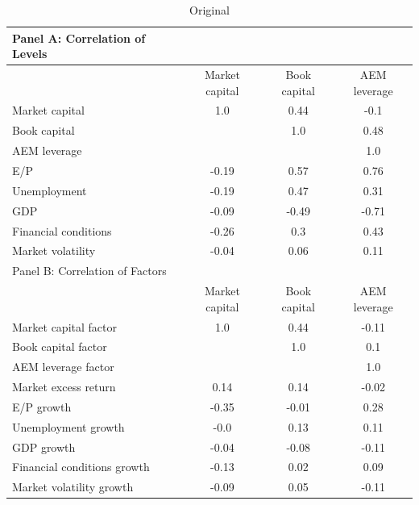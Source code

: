 \documentclass{article}
\begin{document}
    \begin{table}[htbp]
    \centering
    \caption{\label{tab:correlation}Original}
    \begin{adjustbox}{max width=\textwidth}
    \small
    \begin{tabular}{lccc}
        \toprule
        Panel A: Correlation of Levels \\
        \midrule
         & Market capital & Book capital & AEM leverage \\
        \midrule
        Market capital & 1.0 & 0.44 & -0.1 \\
Book capital &  & 1.0 & 0.48 \\
AEM leverage &  &  & 1.0 \\
E/P & -0.19 & 0.57 & 0.76 \\
Unemployment & -0.19 & 0.47 & 0.31 \\
GDP & -0.09 & -0.49 & -0.71 \\
Financial conditions & -0.26 & 0.3 & 0.43 \\
Market volatility & -0.04 & 0.06 & 0.11 \\
        \midrule
        Panel B: Correlation of Factors \\
        \midrule
         & Market capital & Book capital & AEM leverage \\
        \midrule
        Market capital factor & 1.0 & 0.44 & -0.11 \\
Book capital factor &  & 1.0 & 0.1 \\
AEM leverage factor &  &  & 1.0 \\
Market excess return & 0.14 & 0.14 & -0.02 \\
E/P growth & -0.35 & -0.01 & 0.28 \\
Unemployment growth & -0.0 & 0.13 & 0.11 \\
GDP growth & -0.04 & -0.08 & -0.11 \\
Financial conditions growth & -0.13 & 0.02 & 0.09 \\
Market volatility growth & -0.09 & 0.05 & -0.11 \\
        \bottomrule
    \end{tabular}
    \end{adjustbox}
    \end{table}
    
\end{document}
